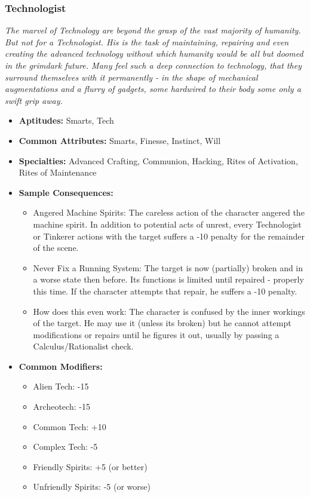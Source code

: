 \subsubsection{Technologist}\label{Technologist}
\textit{The marvel of Technology are beyond the grasp of the vast majority of humanity.
But not for a Technologist.
His is the task of maintaining, repairing and even creating the advanced technology without which humanity would be all but doomed in the grimdark future.
Many feel such a deep connection to technology, that they surround themselves with it permanently - in the shape of mechanical augmentations and a flurry of gadgets, some hardwired to their body some only a swift grip away.}
\begin{itemize}
	\item \textbf{Aptitudes:} Smarts, Tech
	\item \textbf{Common Attributes:} Smarts, Finesse, Instinct, Will 
	\item \textbf{Specialties:} Advanced Crafting, Communion, Hacking, Rites of Activation, Rites of Maintenance
	\item \textbf{Sample Consequences:} 
	\begin{itemize}
		\item Angered Machine Spirits: The careless action of the character angered the machine spirit. In addition to potential acts of unrest, every Technologist or Tinkerer actions with the target suffers a -10 penalty for the remainder of the scene.
		\item Never Fix a Running System: The target is now (partially) broken and in a worse state then before. Its functions is limited until repaired - properly this time. If the character attempts that repair, he suffers a -10 penalty.
		\item How does this even work: The character is confused by the inner workings of the target. He may use it (unless its broken) but he cannot attempt modifications or repairs until he figures it out, usually by passing a Calculus/Rationalist check.
	\end{itemize}
	\item \textbf{Common Modifiers:}
	\begin{itemize}
		\item Alien Tech: -15
		\item Archeotech: -15
		\item Common Tech: +10
		\item Complex Tech: -5
		\item Friendly Spirits: +5 (or better)
		\item Unfriendly Spirits: -5 (or worse)
	\end{itemize}
\end{itemize}


